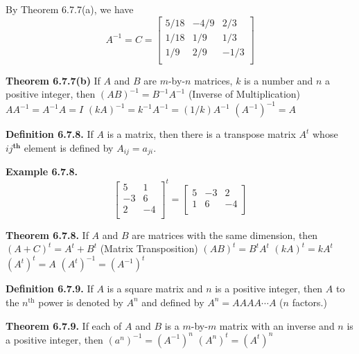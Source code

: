 \begin{large}

By Theorem 6.7.7(a), we have \nl
 \begin{equation*}
A^{-1} = C = \left[
\begin{array}{rrr}
5/18 & -4/9 & 2/3\\
1/18&1/9&1/3\\
1/9&2/9&-1/3\\
\end{array}
\right]
\end{equation*}\nl

\textbf{Theorem 6.7.7(b)}  If $A$ and $B$ are $m$-by-$n$ matrices, $k$ is a number and $n$ a positive integer, then\nl
$(AB)^{-1} = B^{-1}A^{-1}$ (Inverse of Multiplication)\nl
$AA^{-1} = A^{-1}A = I$\nl
$(kA)^{-1} = k^{-1}A^{-1} = (1/k)A^{-1}$\nl
$(A^{-1})^{-1} = A$\nl


\textbf{Definition 6.7.8.}  If $A$ is a matrix, then there is a transpose matrix $A^{t}$ whose $ij^{\textbf{th}}$ element is defined by $A_{ij} = a_{ji}.$\nl

\textbf{Example 6.7.8.}\nl
\begin{equation*}
\left[
\begin{array}{rr}
5 &1 \\
-3&6\\
2&-4\\
\end{array}
\right]^{t}
=
\left[
\begin{array}{rrr}
5 &-3&2 \\
1&6&-4\\
\end{array}
\right]
\end{equation*}\nl

\textbf{Theorem 6.7.8.}  If $A$ and $B$ are matrices with the same dimension, then\nl
$(A + C)^{t} = A^{t} + B^{t}$    (Matrix Transposition)\nl
$(AB)^{t} = B^{t}A^{t}$\nl
$(kA)^{t} = kA^{t}$\nl
$(A^{t})^{t}= A$\nl
$(A^{t})^{-1} = (A^{-1})^{t}$\nl

\textbf{Definition 6.7.9.}  If $A$ is a square matrix and $n$ is a positive integer, then $A$ to the $n^{\text{th}}$ power is denoted by $A^{n}$ and defined by $A^{n} = AAAA \cdots A$ ($n$ factors.)\nl

\textbf{Theorem 6.7.9.}  If each of $A$ and $B$ is a $m$-by-$m$ matrix with an inverse and $n$ is a positive integer, then \nl
$(a^{n})^{-1} = (A^{-1})^{n}$\nl
$(A^{n})^{t} = (A^{t})^{n}$\nl

\newpage
{}


\end{large}
